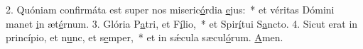 2. Quóniam confirmáta est super nos miseric\uline{ó}rdia \uline{e}jus:~* et véritas Dómini manet \uline{i}n æt\uline{é}rnum.
3. Glória P\uline{a}tri, et F\uline{í}lio,~* et Spir\uline{í}tui S\uline{a}ncto.
4. Sicut erat in princípio, et n\uline{u}nc, et s\uline{e}mper,~* et in sǽcula sæcul\uline{ó}rum. \uline{A}men.
